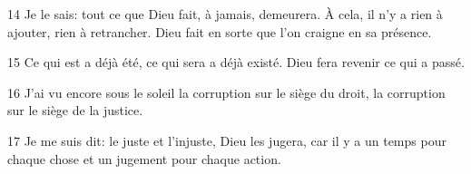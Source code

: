 
14 Je le sais: tout ce que Dieu fait, à jamais, demeurera. À cela, il n’y a rien à ajouter, rien à retrancher. Dieu fait en sorte que l’on craigne en sa présence.

15 Ce qui est a déjà été, ce qui sera a déjà existé. Dieu fera revenir ce qui a passé.

16 J’ai vu encore sous le soleil la corruption sur le siège du droit, la corruption sur le siège de la justice.

17 Je me suis dit: le juste et l’injuste, Dieu les jugera, car il y a un temps pour chaque chose et un jugement pour chaque action.